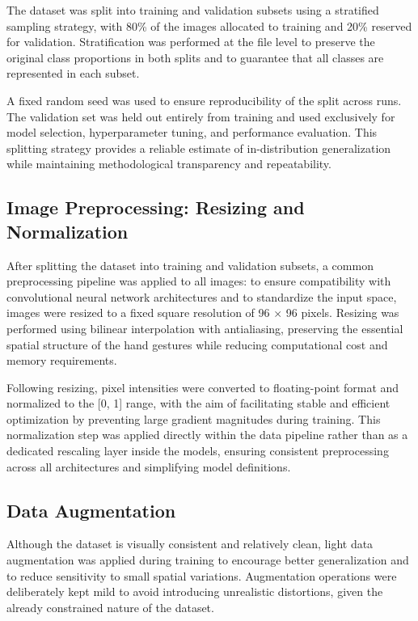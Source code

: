 \documentclass{article}
\begin{document}
The dataset was split into training and validation subsets using a
stratified sampling strategy, with 80\% of the images allocated to
training and 20\% reserved for validation. Stratification was performed
at the file level to preserve the original class proportions in both
splits and to guarantee that all classes are represented in each subset.

A fixed random seed was used to ensure reproducibility of the split
across runs. The validation set was held out entirely from training and
used exclusively for model selection, hyperparameter tuning, and
performance evaluation. This splitting strategy provides a reliable
estimate of in-distribution generalization while maintaining
methodological transparency and repeatability.

\subsection{Image Preprocessing: Resizing and Normalization}

After splitting the dataset into training and validation subsets, a
common preprocessing pipeline was applied to all images: to ensure compatibility with convolutional neural network architectures
and to standardize the input space, images were resized to a fixed
square resolution of 96 × 96 pixels. Resizing was performed using
bilinear interpolation with antialiasing, preserving the essential
spatial structure of the hand gestures while reducing computational cost
and memory requirements.

Following resizing, pixel intensities were converted to floating-point
format and normalized to the {[}0, 1{]} range, with the aim of facilitating
stable and efficient optimization by preventing large gradient magnitudes 
during training. This normalization step was applied directly within 
the data pipeline rather than as a dedicated rescaling layer inside the 
models, ensuring consistent preprocessing across all architectures and 
simplifying model definitions.

\subsection{Data Augmentation}

Although the dataset is visually consistent and relatively clean, light
data augmentation was applied during training to encourage better
generalization and to reduce sensitivity to small spatial variations.
Augmentation operations were deliberately kept mild to avoid introducing
unrealistic distortions, given the already constrained nature of the
dataset.
\end{document}

